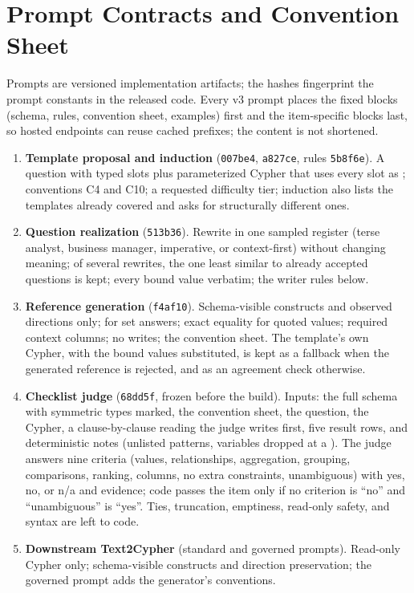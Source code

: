 \section{Prompt Contracts and Convention Sheet}
\label{app:prompts}
\label{sec:prompt_contracts}
Prompts are versioned implementation artifacts; the hashes fingerprint the prompt constants in the released code. Every v3 prompt places the fixed blocks (schema, rules, convention sheet, examples) first and the item-specific blocks last, so hosted endpoints can reuse cached prefixes; the content is not shortened.
\begin{enumerate}\setlength\itemsep{1pt}
\item \textbf{Template proposal and induction} (\texttt{007be4}, \texttt{a827ce}, rules \texttt{5b8f6e}). A question with typed slots plus parameterized Cypher that uses every slot as ; conventions C4 and C10; a requested difficulty tier; induction also lists the templates already covered and asks for structurally different ones.
\item \textbf{Question realization} (\texttt{513b36}). Rewrite in one sampled register (terse analyst, business manager, imperative, or context-first) without changing meaning; of several rewrites, the one least similar to already accepted questions is kept; every bound value verbatim; the writer rules below.
\item \textbf{Reference generation} (\texttt{f4af10}). Schema-visible constructs and observed directions only;  for set answers; exact equality for quoted values; required context columns; no writes; the convention sheet. The template's own Cypher, with the bound values substituted, is kept as a fallback when the generated reference is rejected, and as an agreement check otherwise.
\item \textbf{Checklist judge} (\texttt{68dd5f}, frozen before the build). Inputs: the full schema with symmetric types marked, the convention sheet, the question, the Cypher, a clause-by-clause reading the judge writes first, five result rows, and deterministic notes (unlisted patterns, variables dropped at a ). The judge answers nine criteria (values, relationships, aggregation, grouping, comparisons, ranking, columns, no extra constraints, unambiguous) with yes, no, or n/a and evidence; code passes the item only if no criterion is ``no'' and ``unambiguous'' is ``yes''. Ties, truncation, emptiness, read-only safety, and syntax are left to code.
\item \textbf{Downstream Text2Cypher} (standard and governed prompts). Read-only Cypher only; schema-visible constructs and direction preservation; the governed prompt adds the generator's conventions.
\end{enumerate}

